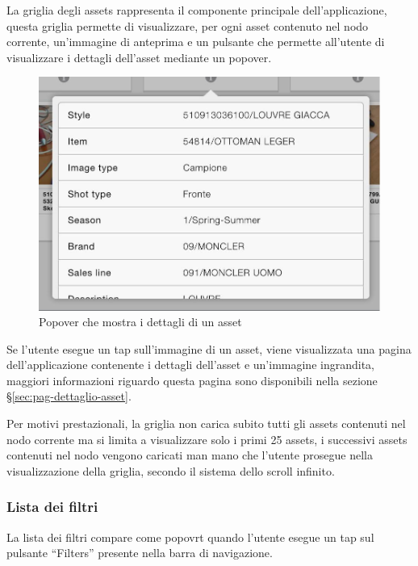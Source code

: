 La griglia degli assets rappresenta il componente principale dell'applicazione, questa griglia permette di visualizzare, per ogni asset contenuto nel nodo corrente, un'immagine di anteprima e un pulsante che permette all'utente di visualizzare i dettagli dell'asset mediante un \gls{popover}.

\begin{figure}[htp]
\centering
\includegraphics[width=\textwidth*3/4]{../immagini/warda-gallery-dettaglio}
\caption{Popover che mostra i dettagli di un asset}  
\end{figure}

Se l'utente esegue un \gls{tap} sull'immagine di un asset, viene visualizzata una pagina dell'applicazione contenente i dettagli dell'asset e un'immagine ingrandita, maggiori informazioni riguardo questa pagina sono disponibili nella sezione §\ref{sec:pag-dettaglio-asset}.


Per motivi prestazionali, la griglia non carica subito tutti gli assets contenuti nel nodo corrente ma si limita a visualizzare solo i primi 25 assets, i successivi assets contenuti nel nodo vengono caricati man mano che l'utente prosegue nella visualizzazione della griglia, secondo il sistema dello scroll infinito.

\subsubsection{Lista dei filtri}

La lista dei filtri compare come popovrt quando l'utente esegue un tap sul pulsante ``Filters'' presente nella barra di navigazione.

